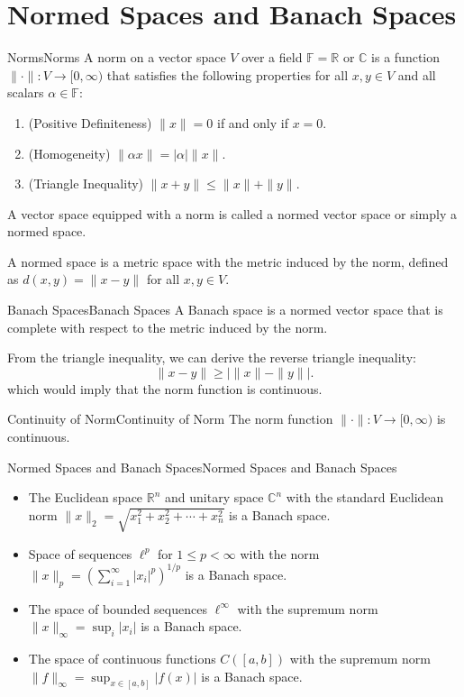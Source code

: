 \documentclass[../main.tex]{subfiles}
\begin{document}
\section{Normed Spaces and Banach Spaces}

\begin{definition}{Norms}{Norms}
	A norm on a vector space $V$ over a field $\mathbb{F}=\mathbb{R}$ or $\mathbb{C}$ is a function $\|\cdot\|: V \rightarrow [0, \infty)$ that satisfies the following properties for all $x, y \in V$ and all scalars $\alpha \in \mathbb{F}$:
	\begin{enumerate}
		\item (Positive Definiteness) $\|x\| = 0$ if and only if $x = 0$.
		\item (Homogeneity) $\|\alpha x\| = |\alpha| \|x\|$.
		\item (Triangle Inequality) $\|x + y\| \leq \|x\| + \|y\|$.
	\end{enumerate}

	A vector space equipped with a norm is called a normed vector space or simply a normed space.
\end{definition}

A normed space is a metric space with the metric induced by the norm, defined as $d(x, y) = \|x - y\|$ for all $x, y \in V$.

\begin{definition}{Banach Spaces}{Banach Spaces}
	A Banach space is a normed vector space that is complete with respect to the metric induced by the norm.
\end{definition}

From the triangle inequality, we can derive the reverse triangle inequality:
\begin{equation*}
	\|x - y\| \geq \left|\|x\| - \|y\|\right|.
\end{equation*}
which would imply that the norm function is continuous.

\begin{theorem}{Continuity of Norm}{Continuity of Norm}
	The norm function $\|\cdot\|: V \rightarrow [0, \infty)$ is continuous.
\end{theorem}

\begin{example}{Normed Spaces and Banach Spaces}{Normed Spaces and Banach Spaces}
	\begin{itemize}
		\item The Euclidean space $\mathbb{R}^n$ and unitary space $\mathbb{C}^n$ with the standard Euclidean norm $\|x\|_2 = \sqrt{x_1^2 + x_2^2 + \cdots + x_n^2}$ is a Banach space.
		\item Space of sequences $\ell^p$ for $1 \leq p < \infty$ with the norm $\|x\|_p = \left( \sum_{i=1}^\infty |x_i|^p \right)^{1/p}$ is a Banach space.
		\item The space of bounded sequences $\ell^\infty$ with the supremum norm $\|x\|_\infty = \sup_i |x_i|$ is a Banach space.
		\item The space of continuous functions $C([a, b])$ with the supremum norm $\|f\|_\infty = \sup_{x \in [a, b]} |f(x)|$ is a Banach space.
	\end{itemize}
\end{example}
\end{document}
